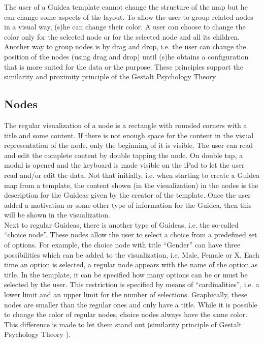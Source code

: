 The user of a Guidea template cannot change the structure of the map but he can change some aspects of the layout. To allow the user to group related nodes in a visual way, (s)he can change their color. A user can choose to change the color only for the selected node or for the selected node and all its children. Another way to group nodes is by drag and drop, i.e. the user can change the position of the nodes (using drag and drop) until (s)he obtains a configuration that is more suited for the data or the purpose. These principles support the similarity and proximity principle of the Gestalt Psychology Theory \citep{koffka2013principles}

\subsection{Nodes}\label{sec:nodes}
The regular visualization of a node is a rectangle with rounded corners with a title and some content. If there is not enough space for the content in the visual representation of the node, only the beginning of it is visible. The user can read and edit the complete content by double tapping the node. On double tap, a modal is opened and the keyboard is made visible on the iPad to let the user read and/or edit the data. Not that initially, i.e. when starting to create a Guidea map from a template, the content shown (in the visualization) in the nodes is the description for the Guideas given by the creator of the template. Once the user added a motivation or some other type of information for the Guidea, then this will be shown in the visualization.\\

Next to regular Guideas, there is another type of Guideas, i.e. the so-called ``choice node''. These nodes allow the user to select a choice from a predefined set of options. For example, the choice node with title ``Gender'' can have three possibilities which can be added to the visualization, i.e. Male, Female or X. Each time an option is selected, a regular node appears with the name of the option as title. In the template, it can be specified how many options can be or must be selected by the user. This restriction is specified by means of ``cardinalities'', i.e. a lower limit and an upper limit for the number of selections. Graphically, these nodes are smaller than the regular ones and only have a title. While it is possible to change the color of regular nodes, choice nodes always have the same color. This difference is made to let them stand out (similarity principle of Gestalt Psychology Theory \citep{koffka2013principles}).\\

